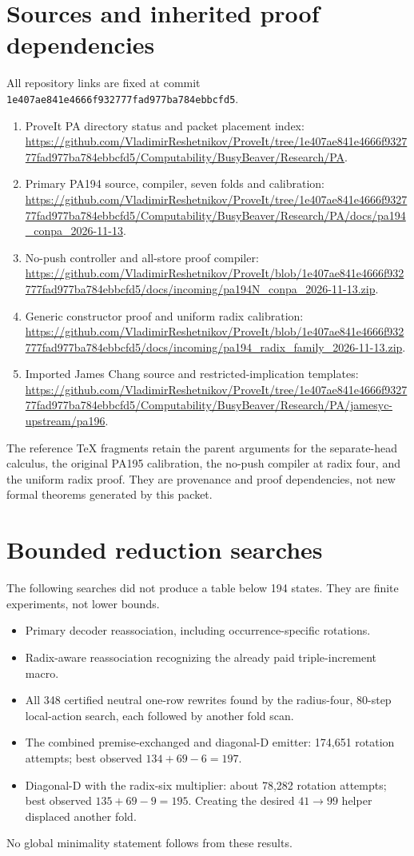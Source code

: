 \documentclass[11pt,letterpaper]{article}
\begin{document}
\section{Sources and inherited proof dependencies}
All repository links are fixed at commit
\nolinkurl{1e407ae841e4666f932777fad977ba784ebbcfd5}.
\begin{enumerate}
\item ProveIt PA directory status and packet placement index:
\url{https://github.com/VladimirReshetnikov/ProveIt/tree/1e407ae841e4666f932777fad977ba784ebbcfd5/Computability/BusyBeaver/Research/PA}.
\item Primary PA194 source, compiler, seven folds and calibration:
\url{https://github.com/VladimirReshetnikov/ProveIt/tree/1e407ae841e4666f932777fad977ba784ebbcfd5/Computability/BusyBeaver/Research/PA/docs/pa194_conpa_2026-11-13}.
\item No-push controller and all-store proof compiler:
\url{https://github.com/VladimirReshetnikov/ProveIt/blob/1e407ae841e4666f932777fad977ba784ebbcfd5/docs/incoming/pa194N_conpa_2026-11-13.zip}.
\item Generic constructor proof and uniform radix calibration:
\url{https://github.com/VladimirReshetnikov/ProveIt/blob/1e407ae841e4666f932777fad977ba784ebbcfd5/docs/incoming/pa194_radix_family_2026-11-13.zip}.
\item Imported James Chang source and restricted-implication templates:
\url{https://github.com/VladimirReshetnikov/ProveIt/tree/1e407ae841e4666f932777fad977ba784ebbcfd5/Computability/BusyBeaver/Research/PA/jamesyc-upstream/pa196}.
\end{enumerate}
The reference TeX fragments retain the parent arguments for the
separate-head calculus, the original PA195 calibration, the no-push
compiler at radix four, and the uniform radix proof. They are provenance
and proof dependencies, not new formal theorems generated by this packet.

\appendix
\section{Bounded reduction searches}
The following searches did not produce a table below 194 states.
They are finite experiments, not lower bounds.
\begin{itemize}
\item Primary decoder reassociation, including occurrence-specific rotations.
\item Radix-aware reassociation recognizing the already paid triple-increment macro.
\item All 348 certified neutral one-row rewrites found by the
radius-four, 80-step local-action search, each followed by another fold scan.
\item The combined premise-exchanged and diagonal-D emitter:
174,651 rotation attempts; best observed $134+69-6=197$.
\item Diagonal-D with the radix-six multiplier:
about 78,282 rotation attempts; best observed $135+69-9=195$.
Creating the desired $41\to99$ helper displaced another fold.
\end{itemize}
No global minimality statement follows from these results.
\end{document}
